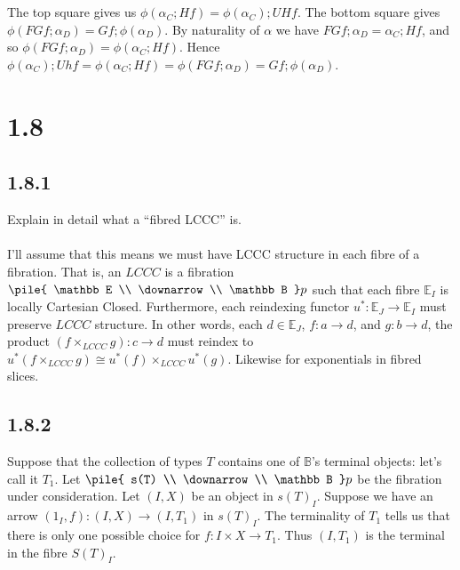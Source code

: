 \documentclass{article}
\newcommand{\vrt}[2]{
\pile{
#1 \\
\downarrow \\
#2
}
}
\begin{document}
~\\~\\
The top square gives us $\phi(\alpha_C;Hf) = \phi(\alpha_C);UHf$. The bottom square gives
$\phi(FGf;\alpha_D) = Gf;\phi(\alpha_D)$. By naturality of $\alpha$ we have $FGf;\alpha_D = \alpha_C;Hf$, and so
$\phi(FGf;\alpha_D) = \phi(\alpha_C;Hf)$. Hence $\phi(\alpha_C);Uhf = \phi(\alpha_C;Hf) = \phi(FGf;\alpha_D) = Gf;\phi(\alpha_D)$.

\section*{1.8}

\subsection*{1.8.1}

Explain in detail what a ``fibred LCCC'' is.\\~\\

I'll assume that this means we must have LCCC structure in each fibre of a fibration.
That is, an $LCCC$ is a fibration $\vrt{\mathbb E}{\mathbb B}p$ such that each fibre
$\mathbb E_I$ is locally Cartesian Closed. Furthermore, each reindexing functor $u^* : \mathbb E_J \to \mathbb E_I$
must preserve $LCCC$ structure. In other words, each $d \in \mathbb E_J$, $f : a \to d$, and $g : b \to d$,
the product $(f \times_{LCCC} g) : c \to d$ must reindex to $u^*(f \times_{LCCC} g) \cong u^*(f) \times_{LCCC} u^*(g)$. 
Likewise for exponentials in fibred slices. 

\subsection*{1.8.2}

Suppose that the collection of types $T$ contains one of $\mathbb B$'s terminal objects: let's call it $T_1$.
Let $\vrt{s(T)}{\mathbb B}p$ be the fibration under consideration.
Let $(I,X)$ be an object in $s(T)_I$. Suppose we have an arrow $(1_I,f) : (I,X) \to (I, T_1)$ in $s(T)_I$.
The terminality of $T_1$ tells us that there is only one possible choice for $f : I \times X \to T_1$.
Thus $(I, T_1)$ is the terminal in the fibre $S(T)_I$. 
\end{document}
